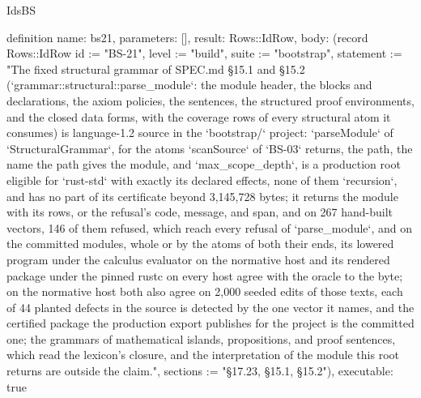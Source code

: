 \begin{lexlean}{IdsBS}
\begin{semanticmodule}
definition{
  name: bs21,
  parameters: [],
  result: Rows::IdRow,
  body: (record Rows::IdRow {id := "BS-21", level := "build", suite := "bootstrap", statement := "The fixed structural grammar of SPEC.md §15.1 and §15.2 (`grammar::structural::parse_module`: the module header, the blocks and declarations, the axiom policies, the sentences, the structured proof environments, and the closed data forms, with the coverage rows of every structural atom it consumes) is language-1.2 source in the `bootstrap/` project: `parseModule` of `StructuralGrammar`, for the atoms `scanSource` of `BS-03` returns, the path, the name the path gives the module, and `max_scope_depth`, is a production root eligible for `rust-std` with exactly its declared effects, none of them `recursion`, and has no part of its certificate beyond 3,145,728 bytes; it returns the module with its rows, or the refusal's code, message, and span, and on 267 hand-built vectors, 146 of them refused, which reach every refusal of `parse_module`, and on the committed modules, whole or by the atoms of both their ends, its lowered program under the calculus evaluator on the normative host and its rendered package under the pinned rustc on every host agree with the oracle to the byte; on the normative host both also agree on 2,000 seeded edits of those texts, each of 44 planted defects in the source is detected by the one vector it names, and the certified package the production export publishes for the project is the committed one; the grammars of mathematical islands, propositions, and proof sentences, which read the lexicon's closure, and the interpretation of the module this root returns are outside the claim.", sections := "§17.23, §15.1, §15.2"}),
  executable: true
}


\end{semanticmodule}
\end{lexlean}
